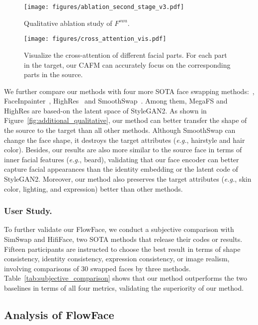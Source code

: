 \begin{figure}[t]
\centering
\texttt{[image: figures/ablation\_second\_stage\_v3.pdf]}  
\caption{Qualitative ablation study of $F^{swa}$.}
\label{fig:ablation_second}
\end{figure}

\begin{figure}[t]
\centering
\texttt{[image: figures/cross\_attention\_vis.pdf]}  
\caption{Visualize the cross-attention of different facial parts. For each part in the target, our CAFM can accurately focus on the corresponding parts in the source.
}
\label{fig:cross_att_vis}
\end{figure}

We further compare our methods with four more SOTA face swapping methods:~\cite{zhu2021one}, FaceInpainter~\cite{li2021faceinpainter}, HighRes~\cite{xu2022high} and SmoothSwap~\cite{kim2022smooth}. Among them, MegaFS and HighRes are based-on the latent space of StyleGAN2. As shown in Figure~\ref{fig:additional_qualitative}, our method can better transfer the shape of the source to the target than all other methods. Although SmoothSwap can change the face shape, it destroys the target attributes (\emph{e.g.}, hairstyle and hair color). Besides, our results are also more similar to the source face in terms of inner facial features (\emph{e.g.}, beard), validating that our face encoder can better capture facial appearances than the identity embedding or the latent code of StyleGAN2.
Moreover, our method also preserves the target attributes (\emph{e.g.}, skin color, lighting, and expression) better than other methods.

\subsubsection{User Study.}
To further validate our FlowFace, we conduct a subjective comparison with SimSwap and HifiFace, two SOTA methods that release their codes or results. Fifteen participants are instructed to choose the best result in terms of shape consistency, identity consistency, expression consistency, or image realism, involving comparisons of 30 swapped faces by three methods. Table~\ref{tab:subjective_comparison} shows that our method outperforms the two baselines in terms of all four metrics, validating the superiority of our method.

\subsection{Analysis of FlowFace}

